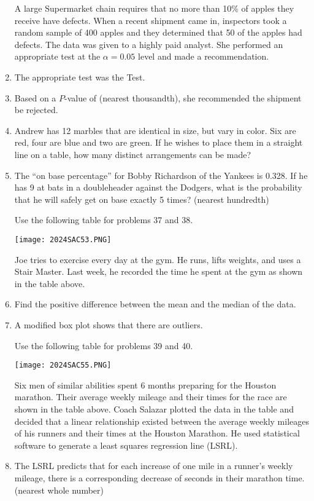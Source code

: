 \documentclass[../uilmath.tex]{subfiles}
\begin{document}
\begin{enumerate}[label=\bfseries\arabic*.]
    A large Supermarket chain requires that no more than 10\% of apples they receive have defects. When a recent shipment came in, inspectors took a random sample of 400 apples and they determined that 50 of the apples 
    had defects. The data was given to a highly paid analyst. She performed an appropriate test at the $\alpha = 0.05$ level and made a recommendation.
    \item %
    The appropriate test was the \blank Test.

    \item %
    Based on a $P$-value of \blank (nearest thousandth), she recommended the shipment be rejected.

    \item %
    Andrew has 12 marbles that are identical in size, but vary in color. Six are red, four are blue and two are green.
    If he wishes to place them in a straight line on a table, how many distinct arrangements can be made?

    \item %
    The ``on base percentage'' for Bobby Richardson of the Yankees is 0.328. If he has 9 at bats in a doubleheader 
    against the Dodgers, what is the probability that he will safely get on base exactly 5 times? (nearest hundredth)


    Use the following table for problems 37 and 38.
    \begin{center}
        \texttt{[image: 2024SAC53.PNG]}
    \end{center}
    Joe tries to exercise every day at the gym. He runs, lifts weights, and uses a Stair Master.
    Last week, he recorded the time he spent at the gym as shown in the table above.
    \item %
    Find the positive difference between the mean and the median of the data.

    \item %
    A modified box plot shows that there are \blank outliers.


    Use the following table for problems 39 and 40.
    \begin{center}
        \texttt{[image: 2024SAC55.PNG]}
    \end{center}
    Six men of similar abilities spent 6 months preparing for the Houston marathon. Their average weekly mileage and their times for the race are shown in the table above.
    Coach Salazar plotted the data in the table and decided that a linear relationship existed between the average weekly mileages of his runners and their times at the Houston Marathon.
    He used statistical software to generate a least squares regression line (LSRL).
    \item %
    The LSRL predicts that for each increase of one mile in a runner's weekly mileage, there is a corresponding decrease of \blank seconds in their marathon time. (nearest whole number)


\end{enumerate}
\end{document}
